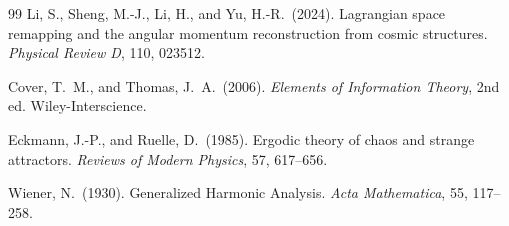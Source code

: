\documentclass[11pt]{article}
\begin{document}
\begin{thebibliography}{99}
Li, S., Sheng, M.-J., Li, H., and Yu, H.-R.\ (2024). Lagrangian space remapping and the angular momentum reconstruction from cosmic structures. \textit{Physical Review D}, 110, 023512.

Cover, T.\ M., and Thomas, J.\ A.\ (2006). \textit{Elements of Information Theory}, 2nd ed. Wiley-Interscience.

Eckmann, J.-P., and Ruelle, D.\ (1985). Ergodic theory of chaos and strange attractors. \textit{Reviews of Modern Physics}, 57, 617--656.

Wiener, N.\ (1930). Generalized Harmonic Analysis. \textit{Acta Mathematica}, 55, 117--258.

\end{thebibliography}
\end{document}
